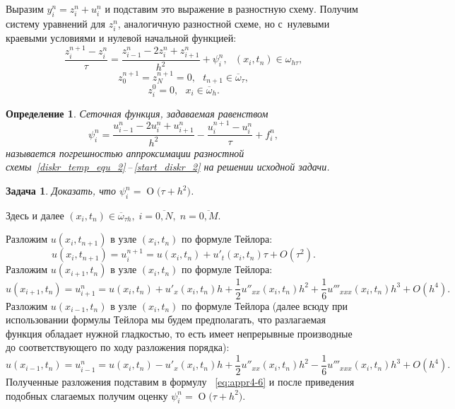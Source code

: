 \documentclass[11pt,a4paper,twoside]{report}
\numberwithin{equation}{section}
\newtheorem*{problem}{Задача}
\newtheorem*{definition}{Определение}
\theoremstyle{definition}
\theoremstyle{plain}
\newcommand{\bigO}[1]{\ensuremath{\operatorname{O}\bigl(#1\bigr)}}
\begin{document}
Выразим $y_i^n = z_i^n + u_i^n$ и подставим
это выражение в разностную схему. Получим систему уравнений для $z_i^n$,
аналогичную разностной схеме, но с~нулевыми краевыми условиями и нулевой начальной
функцией:
%
\begin{equation}
    \label{z_eq}
    \dfrac{z_i^{n+1} - z_i^n}{\tau} = \dfrac{z_{i-1}^n - 2z_i^n +
    z_{i+1}^n}{h^2} + \psi_i^n,~~~(x_i, t_n) \in \omega_{h \tau},
\end{equation}
%
\begin{equation}
    \label{z_boards}
    z_0^{n+1} = z_N^{n+1} = 0,~~~t_{n+1}\in \overline{\omega}_\tau,
\end{equation}
%
\begin{equation}
    \label{z_start}
    z_i^0 = 0,~~~x_i\in \overline{\omega}_h.
\end{equation}
%
\begin{definition}
%
    Сеточная функция, задаваемая равенством
    \begin{equation}
        \label{eq:appr4-6}
        \psi_i^n = \dfrac{u_{i-1}^n - 2u_i^n + u_{i+1}^n}{h^2} -
        \dfrac{u_i^{n+1} - u_i^n}{\tau} + f_i^n,
    \end{equation}
    называется
    погрешностью аппроксимации разностной
    схемы~\eqref{diskr_temp_equ_2}\,--\,\eqref{start_diskr_2}
    на решении исходной задачи.
%
\end{definition}
%
\begin{problem}
%
    Доказать, что $\psi_i^n = \bigO{\tau + h^2}$.
%
\end{problem}
%
\begin{solution}
%
    Здесь и далее $(x_i, t_n) \in \overline{\omega}_{\tau h}, \;i=\overline{0,N},\;
    n=\overline{0,M}$.

    Разложим $u(x_i,t_{n + 1})$ в узле $(x_i,t_n)$ по формуле Тейлора:
    $$
        u(x_i,t_{n + 1}) = u_i^{n + 1} =  u(x_i,t_{n}) + u'_t(x_i,t_{n})\tau +
        O(\tau^2).
    $$
    Разложим $u(x_{i + 1},t_{n})$ в узле $(x_i,t_n)$ по формуле Тейлора:
    $$
        u(x_{i + 1},t_{n}) = u_{i + 1}^{n} =  u(x_i,t_{n}) + u'_x(x_i,t_{n})h +
        \dfrac12u''_{xx}(x_i,t_{n})h^2 + \dfrac16 u'''_{xxx}(x_i,t_{n})h^3  + O(h^4).
    $$
    Разложим $u(x_{i - 1},t_{n})$ в узле $(x_i,t_n)$ по формуле Тейлора (далее всюду
    при использовании формулы Тейлора мы будем предполагать, что разлагаемая
    функция обладает нужной гладкостью, то есть имеет непрерывные производные
    до соответствующего по ходу разложения порядка):
    $$
        u(x_{i - 1},t_{n}) = u_{i - 1}^{n} =  u(x_i,t_{n}) - u'_x(x_i,t_{n})h +
        \dfrac12u''_{xx}(x_i,t_{n})h^2 -\dfrac16 u'''_{xxx}(x_i,t_{n})h^3  + O(h^4).
    $$
    Полученные разложения подставим в формулу ~\eqref{eq:appr4-6} и
    после приведения подобных слагаемых получим оценку $\psi_i^n =
    \bigO{\tau + h^2}$.
%
\end{solution}
%
\end{document}
